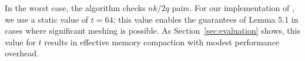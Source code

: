 In the worst case, the algorithm checks $nk/2q$ pairs. For our
implementation of \Mesh, we use a static value of $t = 64$; this value
enables the guarantees of Lemma 5.1 in cases where significant meshing
is possible.  As Section~\ref{sec:evaluation} shows, this value for
$t$ results in effective memory compaction with modest performance
overhead.

